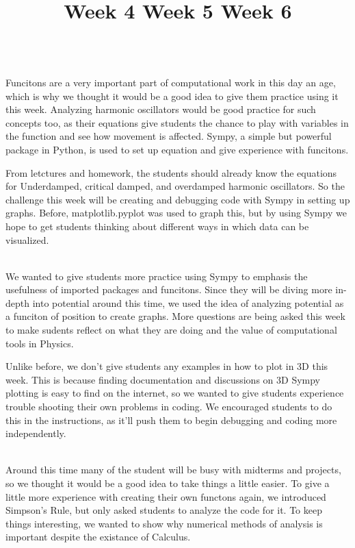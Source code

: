\documentclass[12pt, letterpaper, twoside]{report}
\begin{document}
\newpage
\title{
	\large{Week 4}}\\

Funcitons are a very important part of computational work in this day an age, which is why we thought it would be a good idea to give them practice using it this week. Analyzing harmonic oscillators would be good practice for such concepts too, as their equations give students the chance to play with variables in the function and see how movement is affected. Sympy, a simple but powerful package in Python, is used to set up equation and give experience with funcitons.

From letctures and homework, the students should already know the equations for Underdamped, critical damped, and overdamped harmonic oscillators. So the challenge this week will be creating and debugging code with Sympy in setting up graphs. Before, matplotlib.pyplot was used to graph this, but by using Sympy we hope to get students thinking about different ways in which data can be visualized.

\newpage
\title{
	\large{Week 5}}\\
	
We wanted to give students more practice using Sympy to emphasis the usefulness of imported packages and funcitons. Since they will be diving more in-depth into potential around this time, we used the idea of analyzing potential as a funciton of position to create graphs. More questions are being asked this week to make sudents reflect on what they are doing and the value of computational tools in Physics.

Unlike before, we don't give students any examples in how to plot in 3D this week. This is because finding documentation and discussions on 3D Sympy plotting is easy to find on the internet, so we wanted to give students experience trouble shooting their own problems in coding. We encouraged students to do this in the instructions, as it'll push them to begin debugging and coding more independently.

\newpage
\title{
	\large{Week 6}}\\

Around this time many of the student will be busy with midterms and projects, so we thought it would be a good idea to take things a little easier. To give a little more experience with creating their own functons again, we introduced Simpson's Rule, but only asked students to analyze the code for it. To keep things interesting, we wanted to show why numerical methods of analysis is important despite the existance of Calculus.  
\end{document}
